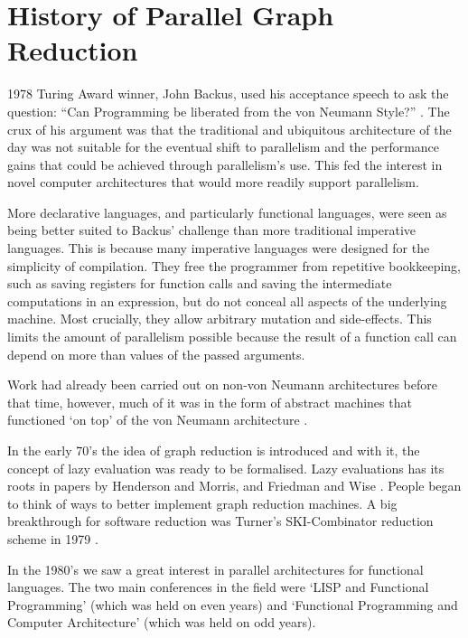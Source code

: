 \section{History of Parallel Graph Reduction}

    1978 Turing Award winner, John Backus, used his acceptance speech to ask the
question: ``Can Programming be liberated from the von Neumann Style?''
\citep{HistoryOfHaskell}. The crux of his argument was that the traditional
and ubiquitous architecture of the day was not suitable for the eventual shift
to parallelism and the performance gains that could be achieved through
parallelism's use. This fed the
interest in novel computer architectures that would more readily support
parallelism.

More declarative languages, and particularly functional languages, were seen as
being better suited to Backus' challenge than more traditional imperative
languages. This is because many imperative languages were designed for the
simplicity of compilation. They free the programmer from repetitive
bookkeeping, such as saving registers for function calls and saving the
intermediate computations in an expression, but do not conceal all aspects of
the underlying machine. Most crucially, they allow arbitrary mutation and
side-effects. This limits the amount of parallelism possible because the result
of a function call can depend on more than values of the passed arguments.

    Work had already been carried out on non-von Neumann architectures
before that time, however, much of it was in the form of abstract machines
that functioned `on top' of the von Neumann architecture \citep{turnerHistory}.

In the early 70's the idea of graph reduction is introduced \citep{wadsworth}
and with it, the concept of lazy evaluation was ready to be formalised.
Lazy evaluations has its roots in papers by Henderson and Morris, and Friedman
and Wise \citep{turnerHistory}.  People began to think of ways to better
implement graph reduction machines.  A big breakthrough for software reduction
was Turner's SKI-Combinator reduction scheme in 1979 \citep{turnerHistory,
clackbook}.

    In the 1980's we saw a great interest in parallel architectures for
functional languages. The two main conferences in the field were `LISP and
Functional Programming' (which was held on even years) and `Functional
Programming and Computer Architecture' (which was held on odd years).

